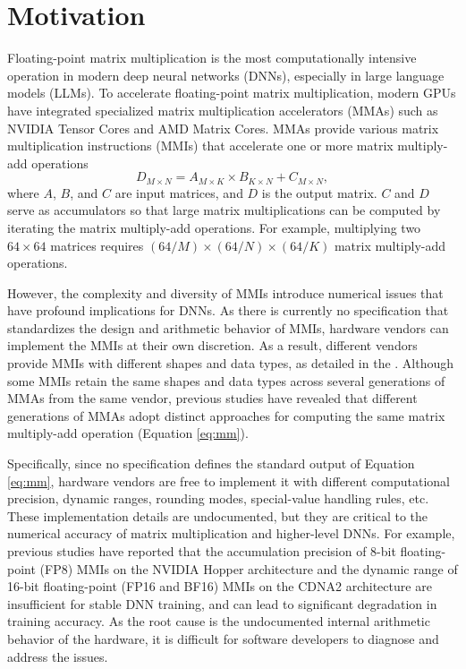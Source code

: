 \section{Motivation}
\label{sec:motivation}

Floating-point matrix multiplication is the most computationally intensive operation in modern deep neural networks (DNNs), especially in large language models (LLMs). To accelerate floating-point matrix multiplication, modern GPUs have integrated specialized matrix multiplication accelerators (MMAs) such as NVIDIA Tensor Cores and AMD Matrix Cores. MMAs provide various matrix multiplication instructions (MMIs) that accelerate one or more matrix multiply-add operations
\begin{equation}
\label{eq:mm}
D_{M\times N} = A_{M\times K} \times B_{K\times N} + C_{M\times N},
\end{equation} 
where $A$, $B$, and $C$ are input matrices, and $D$ is the output matrix. $C$ and $D$ serve as accumulators so that large matrix multiplications can be computed by iterating the matrix multiply-add operations. For example, multiplying two $64\times 64$ matrices requires $(64/M)\times (64/N)\times (64/K)$ matrix multiply-add operations.

However, the complexity and diversity of MMIs introduce numerical issues that have profound implications for DNNs. As there is currently no specification that standardizes the design and arithmetic behavior of MMIs, hardware vendors can implement the MMIs at their own discretion. As a result, different vendors provide MMIs with different shapes and data types, as detailed in the . Although some MMIs retain the same shapes and data types across several generations of MMAs from the same vendor, previous studies \cite{fasi_numerical_2021,li_fttn_2024,xie_revealing_2025} have revealed that different generations of MMAs adopt distinct approaches for computing the same matrix multiply-add operation (Equation \ref{eq:mm}).

Specifically, since no specification defines the standard output of Equation \ref{eq:mm}, hardware vendors are free to implement it with different computational precision, dynamic ranges, rounding modes, special-value handling rules, etc. These implementation details are undocumented, but they are critical to the numerical accuracy of matrix multiplication and higher-level DNNs. For example, previous studies \cite{deepseek-ai_deepseek-v3_2024,pytorch_developers_pytorch_2025} have reported that the accumulation precision of 8-bit floating-point (FP8) MMIs on the NVIDIA Hopper architecture and the dynamic range of 16-bit floating-point (FP16 and BF16) MMIs on the CDNA2 architecture are insufficient for stable DNN training, and can lead to significant degradation in training accuracy. As the root cause is the undocumented internal arithmetic behavior of the hardware, it is difficult for software developers to diagnose and address the issues.

